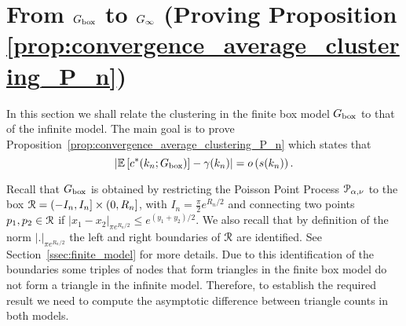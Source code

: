 \section{From $G_{\text{box}}$ to $G_{\infty}$ (Proving Proposition \ref{prop:convergence_average_clustering_P_n})}\label{sec:clustering_Pn_to_P}

In this section we shall relate the clustering in the finite box model $G_{\text{box}}$ to that of the infinite model. The main goal is to prove Proposition~\ref{prop:convergence_average_clustering_P_n} which states that
\[
	\left|\mathbb{E}\left[c^\ast(k_n; G_{\text{box}})\right] - \gamma(k_n)\right| = o\left(s(k_n)\right).
\] 

Recall that $G_{\text{box}}$ is obtained by restricting the Poisson Point Process ${\mathcal P}_{\alpha, \nu}$ to the box ${\mathcal R} = (-I_n, I_n] \times (0, R_n]$, with $I_n = \frac{\pi}{2} e^{R_n/2}$ and connecting two points $p_1, p_2 \in {\mathcal R}$ if $|x_1 - x_2|_{\pi e^{R_n/2}} \le e^{(y_1 + y_2)/2}$. We also recall that by definition of the norm $|.|_{\pi e^{R_n/2}}$ the left and right boundaries of ${\mathcal R}$ are identified. See Section~\ref{ssec:finite_model} for more details. Due to this identification of the boundaries some triples of nodes that form triangles in the finite box model do not form a triangle in the infinite model. Therefore, to establish the required result we need to compute the asymptotic difference between triangle counts in both models.



